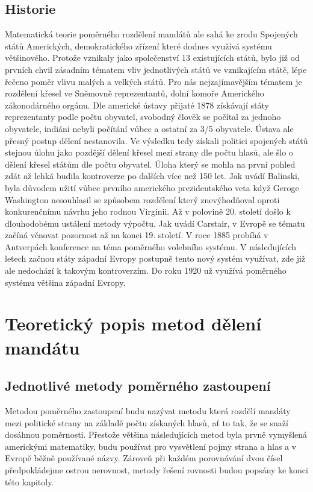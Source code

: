 \documentclass[12pt]{report}
\begin{document}
\section{Historie} Matematická teorie poměrného rozdělení mandátů ale sahá ke zrodu Spojených států Amerických, demokratického zřízení které dodnes využívá systému většinového.\autocite{BAL2} Protože vznikaly jako společenství 13 existujících států, bylo již od prvních chvil zásadním tématem vliv jednotlivých států ve vznikajícím státě, lépe řečeno poměr vlivu malých a velkých států.
Pro nás nejzajímavějším tématem je rozdělení křesel ve Sněmovně reprezentantů, dolní komoře Amerického zákonodárného orgánu.
Dle americké ústavy přijaté 1878 získávají státy reprezentanty podle počtu obyvatel, svobodný člověk se počítal za jednoho obyvatele, indiáni nebyli počítání vůbec a ostatní za 3/5 obyvatele.\autocite{CON} Ústava ale přesný postup dělení nestanovila.
Ve výsledku tedy získali politici spojených států stejnou úlohu jako pozdější dělení křesel mezi strany dle počtu hlasů, ale šlo o dělení křesel státům dle počtu obyvatel.
Úloha který se mohla na první pohled zdát až lehká budila kontroverze po dalších více než 150 let.
Jak uvádí Balinski, byla důvodem užití vůbec prvního amerického prezidentského veta když Geroge Washington nesouhlasil se způsobem rozdělení který znevýhodňoval oproti konkurenčnímu návrhu jeho rodnou Virginii.\autocite{BAL1}
Až v polovině 20.
století došlo k dlouhodobému ustálení metody výpočtu.
Jak uvádí Carstair, v Evropě se tématu začíná věnovat pozornost až na konci 19.
století.
V roce 1885 probíhá v Antverpách konference na téma poměrného volebního systému.
V následujících letech začnou státy západní Evropy postupně tento nový systém využívat, zde již ale nedochází k takovým kontroverzím.
Do roku 1920 už využívá poměrného systému většina západní Evropy.\autocite{BOO} 
\chapter{Teoretický popis metod dělení mandátu}
\section{Jednotlivé metody poměrného zastoupení} Metodou poměrného zastoupení budu nazývat metodu která rozdělí mandáty mezi politické strany na základě počtu získaných hlasů, ať to tak, že se snaží dosáhnou poměrnosti.
Přestože většina následujících metod byla prvně vymyšlená americkými matematiky, budu používat pro vysvětlení pojmy strana a hlas a v Evropě běžně používané názvy.
Zároveň při každém porovnávání dvou čísel předpokládejme ostrou nerovnost, metody řešení rovnosti budou popsány ke konci této kapitoly.
\end{document}
